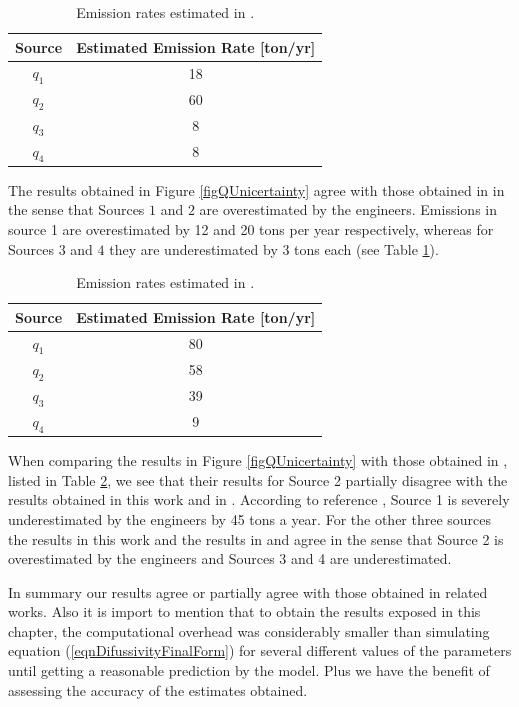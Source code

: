\documentclass{sfuthesis}
\begin{document}
\begin{table}[H]
\centering
\begin{tabular}{|c|c|}
\hline 
Source & Estimated Emission Rate {[}ton/yr{]}\tabularnewline
\hline 
\hline 
$q_{1}$ & 18\tabularnewline
\hline 
$q_{2}$ & 60\tabularnewline
\hline 
$q_{3}$ & 8\tabularnewline
\hline 
$q_{4}$ & 8\tabularnewline
\hline 
\end{tabular}
\caption{Emission rates estimated in \cite{lushi2010inverse}.}
\label{tabLushi}
\end{table}



The results obtained in Figure \ref{figQUnicertainty} agree with those obtained in \cite{lushi2010inverse} in 
the sense that Sources $1$ and $2$ are overestimated by the engineers. Emissions in source 1 are overestimated
by 12 and 20 tons per year respectively, whereas for Sources $3$ and $4$ they are underestimated by 3 tons each (see Table \ref{tabLushi}). 

\begin{table}[H]
\centering
\begin{tabular}{|c|c|}
\hline 
Source & Estimated Emission Rate {[}ton/yr{]}\tabularnewline
\hline 
\hline 
$q_{1}$ & 80\tabularnewline
\hline 
$q_{2}$ & 58\tabularnewline
\hline 
$q_{3}$ & 39\tabularnewline
\hline 
$q_{4}$ & 9\tabularnewline
\hline 
\end{tabular}
\caption{Emission rates estimated in \cite{hosseini2016airborne}.}
\label{tabHosseini}
\end{table}
When comparing the results in Figure \ref{figQUnicertainty} with those obtained in \cite{hosseini2016airborne}, listed in Table \ref{tabHosseini}, we see that their 
results for Source 2 partially disagree with the results 
obtained in this work and in \cite{lushi2010inverse}. According to  reference \cite{hosseini2016airborne}, Source 1 is severely underestimated by the engineers
by 45 tons a year. For the other three sources the results in this work and the results in \cite{hosseini2016airborne} and \cite{lushi2010inverse} agree in the sense
that Source 2 is overestimated by the engineers and Sources 3 and 4 are underestimated.

In summary our results agree or partially agree with those obtained in related works. Also it is import to mention that  to obtain the results exposed in this chapter,
the computational overhead was considerably smaller than simulating equation (\ref{eqnDifussivityFinalForm}) for several different values of the parameters until getting
a reasonable prediction by the model. Plus we have the benefit of assessing the accuracy of the estimates obtained.
\end{document}
